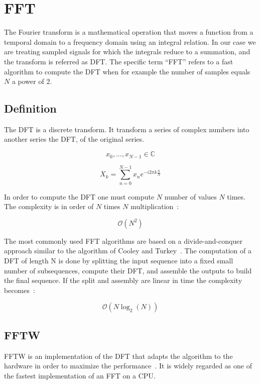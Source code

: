 \section{FFT}
\label{sec:FFT}

The Fourier transform is a mathematical operation that moves a function from a temporal domain to a frequency domain using an integral relation. In our case we are treating sampled signals for which the integrals reduce to a summation, and the transform is referred as \gls{DFT}. The specific term ``\gls{FFT}'' refers to a fast algorithm to compute the \gls{DFT} when for example the number of samples equals $N$ a power of 2.

	\subsection{Definition}

	The \gls{DFT} is a discrete transform. It transform a series of complex numbers into another series the \gls{DFT}, of the original series.

	$$ x_0,...,x_{N -1} \in \mathbb{C} $$

	$$ X_{k} = \displaystyle\sum\limits_{n = 0}^{N -1} x_{n}e^{-i 2 \pi k \frac{n}{N}} $$

	In order to compute the \gls{DFT} one must compute $N$ number of values $N$ times. The complexity is in order of $N$ times $N$ multiplication~:

	$$ \mathcal{O}(N^{2}) $$

	The most commonly used \gls{FFT} algorithms are based on a divide-and-conquer approach similar to the algorithm of Cooley and Turkey~\cite{Cooley65}. The computation of a \gls{DFT} of length N is done by splitting the input sequence into a fixed small number of subsequences, compute their \gls{DFT}, and assemble the outputs to build the final sequence. If the split and assembly are linear in time the complexity becomes~:

	$$ \mathcal{O}(N \log_{2}(N)) $$

   	\subsection{FFTW}

   	\Gls{FFTW} is an implementation of the \gls{DFT} that adapts the algorithm to the hardware in order to maximize the performance~\cite{fftw05}. It is widely regarded as one of the fastest implementation of an \gls{FFT} on a \gls{CPU}.

